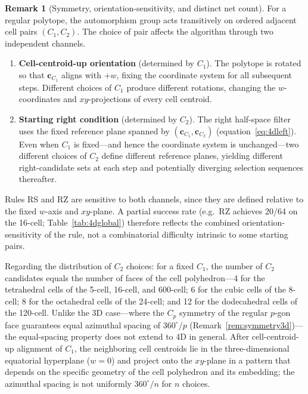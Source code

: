 \documentclass[12pt]{article}
\theoremstyle{definition}
\newtheorem{remark}{Remark}[section]
\begin{document}
\begin{remark}[Symmetry, orientation-sensitivity, and distinct net count]
\label{rem:symmetry}
For a regular polytope, the automorphism group acts transitively on
ordered adjacent cell pairs $(C_1, C_2)$.
The choice of pair affects the algorithm through two independent channels.
\begin{enumerate}[nosep,label=(\roman*)]
  \item \textbf{Cell-centroid-up orientation} (determined by $C_1$).
        The polytope is rotated so that $\mathbf{c}_{C_1}$ aligns with $+w$,
        fixing the coordinate system for all subsequent steps.
        Different choices of $C_1$ produce different rotations, changing
        the $w$-coordinates and $xy$-projections of every cell centroid.
  \item \textbf{Starting right condition} (determined by $C_2$).
        The right half-space filter uses the fixed reference plane
        spanned by $(\mathbf{c}_{C_1}, \mathbf{c}_{C_2})$
        (equation~\eqref{eq:4dleft}).
        Even when $C_1$ is fixed---and hence the coordinate system is
        unchanged---two different choices of $C_2$ define different
        reference planes, yielding different right-candidate sets at
        each step and potentially diverging selection sequences thereafter.
\end{enumerate}
Rules RS and RZ are sensitive to both channels, since they are defined
relative to the fixed $w$-axis and $xy$-plane.
A partial success rate (e.g.\ RZ achieves 20/64 on the 16-cell;
Table~\ref{tab:4dglobal})
therefore reflects the combined orientation-sensitivity of the rule,
not a combinatorial difficulty intrinsic to some starting pairs.

Regarding the distribution of $C_2$ choices: for a fixed $C_1$,
the number of $C_2$ candidates equals the number of faces of the cell
polyhedron---4 for the tetrahedral cells of the 5-cell, 16-cell, and 600-cell;
6 for the cubic cells of the 8-cell; 8 for the octahedral cells of the 24-cell;
and 12 for the dodecahedral cells of the 120-cell.
Unlike the 3D case---where the $C_p$ symmetry of the regular $p$-gon
face guarantees equal azimuthal spacing of $360^\circ/p$
(Remark~\ref{rem:symmetry3d})---the equal-spacing property does not
extend to 4D in general.
After cell-centroid-up alignment of $C_1$, the neighboring cell centroids lie
in the three-dimensional equatorial hyperplane ($w=0$) and project onto
the $xy$-plane in a pattern that depends on the specific geometry of the
cell polyhedron and its embedding; the azimuthal spacing is not
uniformly $360^\circ/n$ for $n$ choices.


\end{remark}
\end{document}

